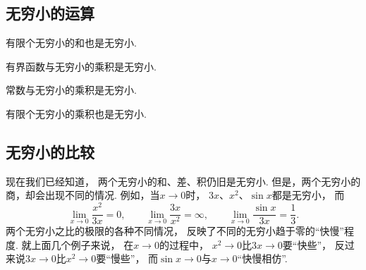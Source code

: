 \subsection{无穷小的运算}
\begin{theorem}
有限个无穷小的和也是无穷小.
\end{theorem}

\begin{theorem}\label{theorem:函数极限.无穷小.有界函数与无穷小的乘积是无穷小}
有界函数与无穷小的乘积是无穷小.
\end{theorem}

\begin{corollary}
常数与无穷小的乘积是无穷小.
\end{corollary}

\begin{corollary}
有限个无穷小的乘积也是无穷小.
\end{corollary}

\subsection{无穷小的比较}
现在我们已经知道，
两个无穷小的和、差、积仍旧是无穷小.
但是，两个无穷小的商，却会出现不同的情况.
例如，当\(x\to0\)时，
\(3x\)、\(x^2\)、\(\sin x\)都是无穷小，
而\[
	\lim_{x\to0}\frac{x^2}{3x}=0, \qquad
	\lim_{x\to0}\frac{3x}{x^2}=\infty, \qquad
	\lim_{x\to0}\frac{\sin x}{3x}=\frac{1}{3}.
\]
两个无穷小之比的极限的各种不同情况，
反映了不同的无穷小趋于零的“快慢”程度.
就上面几个例子来说，
在\(x\to0\)的过程中，
\(x^2\to0\)比\(3x\to0\)要“快些”，
反过来说\(3x\to0\)比\(x^2\to0\)要“慢些”，
而\(\sin x\to0\)与\(x\to0\)“快慢相仿”.

